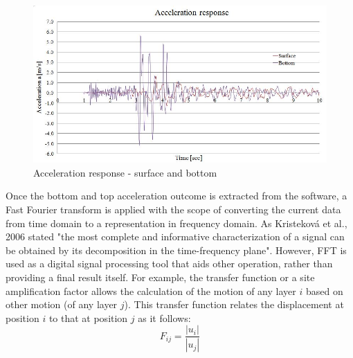 	\begin{figure}[h!]
		\centering
		\includegraphics[width=0.7\linewidth]{"acc_response2"}
		\caption{Acceleration response - surface and bottom}
		\label{acc_resp2}
	\end{figure}
	Once the bottom and top acceleration outcome is extracted from the software, a Fast Fourier transform is applied with the scope of converting the current data from time domain to a \mbox{representation} in frequency domain. As Kristeková et al., 2006 \cite{kristekova2006misfit} stated "the most complete and informative characterization of a signal can be obtained by its decomposition in the time-frequency plane". However, FFT is used as a digital signal processing tool that aids other operation, rather than providing a final result itself. For example, the transfer function or a site amplification factor allows the calculation of the motion of any layer $i$ based on other motion (of any layer $j$). This transfer function relates the displacement at position $i$ to that at position $j$ as it follows:
	\begin{equation}
	F_{ij}=\frac{|u_i|}{|u_j|}
	\end{equation}
	
